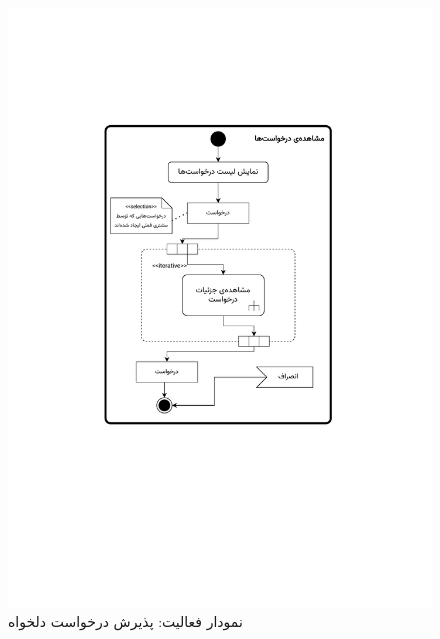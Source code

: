 \begin{figure}
	\centering
	\includegraphics[scale=0.8, page=5]{figs/OOD-activity11-20.pdf}
	\caption{نمودار فعالیت: پذیرش درخواست دلخواه}
\end{figure}
\FloatBarrier
\newpage

